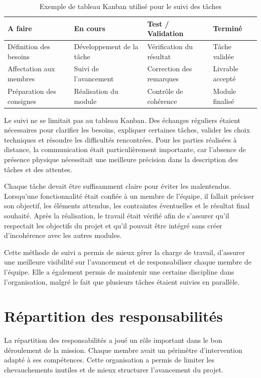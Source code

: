 \begin{table}[H]
\centering
\small
\renewcommand{\arraystretch}{1.4}
\begin{tabular}{|p{3.2cm}|p{3.2cm}|p{3.2cm}|p{3.2cm}|}
\hline
\textbf{A faire} & \textbf{En cours} & \textbf{Test / Validation} & \textbf{Terminé} \\
\hline
Définition des besoins & Développement de la tâche & Vérification du résultat & Tâche validée \\
\hline
Affectation aux membres & Suivi de l'avancement & Correction des remarques & Livrable accepté \\
\hline
Préparation des consignes & Réalisation du module & Contrôle de cohérence & Module finalisé \\
\hline
\end{tabular}
\caption{Exemple de tableau Kanban utilisé pour le suivi des tâches}
\label{tab:kanban-suivi}
\end{table}

Le suivi ne se limitait pas au tableau Kanban. Des échanges réguliers étaient nécessaires pour clarifier les besoins, expliquer certaines tâches, valider les choix techniques et résoudre les difficultés rencontrées. Pour les parties réalisées à distance, la communication était particulièrement importante, car l'absence de présence physique nécessitait une meilleure précision dans la description des tâches et des attentes.

Chaque tâche devait être suffisamment claire pour éviter les malentendus. Lorsqu'une fonctionnalité était confiée à un membre de l'équipe, il fallait préciser son objectif, les éléments attendus, les contraintes éventuelles et le résultat final souhaité. Après la réalisation, le travail était vérifié afin de s'assurer qu'il respectait les objectifs du projet et qu'il pouvait être intégré sans créer d'incohérence avec les autres modules.

Cette méthode de suivi a permis de mieux gérer la charge de travail, d'assurer une meilleure visibilité sur l'avancement et de responsabiliser chaque membre de l'équipe. Elle a également permis de maintenir une certaine discipline dans l'organisation, malgré le fait que plusieurs tâches étaient suivies en parallèle.

\section{Répartition des responsabilités}

La répartition des responsabilités a joué un rôle important dans le bon déroulement de la mission. Chaque membre avait un périmètre d'intervention adapté à ses compétences. Cette organisation a permis de limiter les chevauchements inutiles et de mieux structurer l'avancement du projet.

